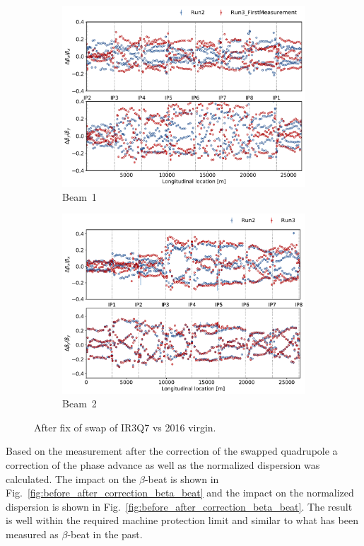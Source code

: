 \documentclass[a4paper]{cernatsnote}
\begin{document}
\begin{figure}[ht]
\begin{subfigure}{.5\textwidth}
  \centering
  \includegraphics[width=.8\linewidth]{plots/beam1/beta_beat_virgin_2016_2021.pdf}  
  \caption{Beam~1}
\end{subfigure}
\begin{subfigure}{.5\textwidth}
  \centering
  \includegraphics[width=.8\linewidth]{plots/beam2/B2_BetaBeat_afterIR3Q7fix_vs_virgin2016.pdf}  
  \caption{Beam~2}
\end{subfigure}
\caption{After fix of swap of IR3Q7 vs 2016 virgin.}
\label{fig:after_swap_vs_2016}
\end{figure}

Based on the measurement after the correction of the swapped quadrupole a correction of the phase advance as well as the normalized dispersion was calculated. The impact on the $\beta$-beat is shown in Fig.~\ref{fig:before_after_correction_beta_beat} and the impact on the normalized dispersion is shown in Fig.~\ref{fig:before_after_correction_beta_beat}. The result is well within the required machine protection limit and similar to what has been measured as $\beta$-beat in the past. 
\end{document}
